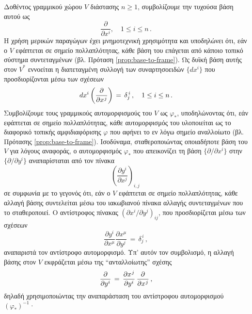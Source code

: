 \documentclass[11pt,a4paper,twoside,openright]{book}
\begin{document}
\noindent
Δοθέντος γραμμικού χώρου $V$ διάστασης $n \ge 1$,
συμβολίζουμε την τυχούσα βάση αυτού ως
\begin{equation*}
\frac{\partial}{\partial x^i},
\quad
1 \le i \le n\,.
\end{equation*}
Η χρήση μερικών παραγώγων έχει μνημοτεχνική χρησιμότητα και υποδηλώνει ότι, εάν ο $V$ εφάπτεται σε σημείο πολλαπλότητας, κάθε βάση του επάγεται από κάποιο τοπικό σύστημα συντεταγμένων (βλ. Πρόταση \ref{prop:base-to-frame}).
Ως δυϊκή βάση αυτής στον $V^*$
εννοείται η διατεταγμένη συλλογή των συναρτησοειδών
$\{dx^i\}$  που προσδιορίζονται μέσω των σχέσεων
\begin{equation*}
dx^i \left( \frac{\partial}{\partial x^{\hspace{.5pt}j}} \right)
\,=
\,
\delta^{\,i}_j\,,
\quad
1 \le i \le n\,.
\end{equation*}
\noindent
Συμβολίζουμε τους γραμμικούς αυτομορφισμούς του $V$
ως $\varphi_*$, υποδηλώνοντας ότι,
εάν εφάπτεται σε σημείο πολλαπλότητας,
κάθε αυτομορφισμός του υλοποιείται ως το διαφορικό
τοπικής αμφιδιαφόρισης $\varphi$
που αφήνει το εν λόγω σημείο
αναλλοίωτο (βλ. Πρότασης \ref{prop:base-to-frame}).
Ισοδύναμα,
σταθεροποιώντας οποιαδήποτε βάση του $V$ για λόγους αναφοράς,
ο αυτομορφισμός $\varphi_*$ που απεικονίζει τη
βάση $\{\partial/\partial x^i\}$ στην $\{\partial/\partial y^i\}$
αναπαρίσταται από τον πίνακα
\begin{equation*}
\left(\frac{\partial y^i}{\partial x^j}\right)_{i,j}\,
\end{equation*}
σε συμφωνία με το γεγονός ότι,
εάν ο $V$ εφάπτεται σε σημείο πολλαπλότητας,
κάθε αλλαγή βάσης συντελείται
μέσω του ιακωβιανού πίνακα αλλαγής συντεταγμένων
που το σταθεροποιεί.
Ο αντίστροφος πίνακας
$(\partial x^i/\partial y^j)_{ij}$,
που προσδιορίζεται μέσω των σχέσεων
\begin{equation}\label{eq:index-annihilation}
\frac{\partial y^i}{\partial x^\mu}
\frac{\partial x^\mu}{\partial y^j}
\,=\,
\delta^{\,i}_j\,,
\end{equation}
αναπαριστά τον αντίστροφο αυτομορφισμό.
Υπ' αυτόν τον συμβολισμό,
η αλλαγή βάσης στον $V$
εκφράζεται μέσω της ``ανταλλοίωτης'' σχέσης
\begin{equation}\label{eq:contravariance-elementary}
\frac{\partial}{\partial y^i}
\,=\,
\frac{\partial x^{\hspace{.5pt}j}}{\partial y^i}
\,
\frac{\partial}{\partial x^{\hspace{.5pt}j}}\,,
\end{equation}
δηλαδή χρησιμοποιώντας την αναπαράσταση του αντίστροφου αυτομορφισμού $(\varphi_*)^{-1}$·
\end{document}
